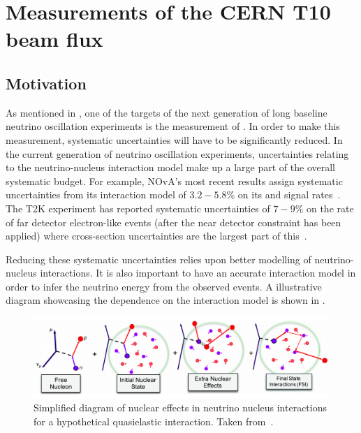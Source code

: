 \chapter{Measurements of the CERN T10 beam flux}
\label{sec:hptpc_beam_flux}

\section{Motivation}
\label{sec:hptpc_beam_flux:motivation}

As mentioned in , one of the targets of the next generation of long baseline neutrino oscillation experiments is the measurement of \dcp.
In order to make this measurement, systematic uncertainties will have to be significantly reduced.
In the current generation of neutrino oscillation experiments, uncertainties relating to the neutrino-nucleus interaction model make up a large part of the overall systematic budget.
For example, NOvA's most recent results assign systematic uncertainties from its interaction model of $3.2-5.8\%$ on its \nue and \anue signal rates~\cite{novaRecent}.
The T2K experiment has reported systematic uncertainties of $7-9\%$ on the rate of far detector electron-like events (after the near detector constraint has been applied) where cross-section uncertainties are the largest part of this~\cite{t2kRecent}.

Reducing these systematic uncertainties relies upon better modelling of neutrino-nucleus interactions.
It is also important to have an accurate interaction model in order to infer the neutrino energy from the observed events.
A illustrative diagram showcasing the dependence on the interaction model is shown in .

\begin{figure}[h]
  \centering
  \includegraphics[width=\linewidth]{files/figures/hptpc_beam_flux/fsiDiag}
  \caption[Simplified diagram of nuclear effects in neutrino nucleus interactions]{Simplified diagram of nuclear effects in neutrino nucleus interactions for a hypothetical quasielastic \numu interaction. Taken from~\cite{nuisanceTalk}.}
  \label{fig:fsiDiag}
\end{figure}

